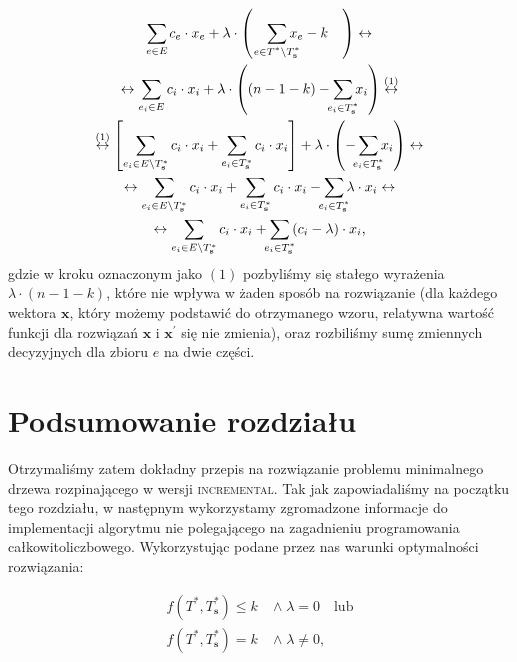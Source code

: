 \begin{gather}\label{eq:imstcosts}
	\sum_{\mathclap{e \in E}} c_{e} \cdot x_{e} + \lambda \cdot \left( \quad \sum_{\mathclap{e \in T^{\ast} \setminus T^{\ast}_{\textbf{s}}}} x_{e} - k \quad \right) \leftrightarrow \\
	\leftrightarrow \sum_{e_{i} \in E} c_{i} \cdot x_{i} + \lambda \cdot \left( \left( n - 1 - k \right) - \sum_{\mathclap{e_{i} \in T^{\ast}_{\textbf{s}}}} x_{i} \right) \overset{\left( 1 \right)}{\leftrightarrow}\\
	\overset{\left( 1 \right)}{\leftrightarrow} \left[ \sum_{e_{i} \in E \setminus T^{\ast}_{\textbf{s}}} c_{i} \cdot x_{i} + \sum_{e_{i} \in T^{\ast}_{\textbf{s}}} c_{i} \cdot x_{i} \right] + \lambda \cdot \left( - \sum_{\mathclap{e_{i} \in T^{\ast}_{\textbf{s}}}} x_{i} \right) \leftrightarrow \\
	\leftrightarrow \sum_{e_{i} \in E \setminus T^{\ast}_{\textbf{s}}} c_{i} \cdot x_{i} + \sum_{e_{i} \in T^{\ast}_{\textbf{s}}} c_{i} \cdot x_{i} - \sum_{\mathclap{e_{i} \in T^{\ast}_{\textbf{s}}}} \lambda \cdot x_{i} \leftrightarrow \\
	\leftrightarrow \sum_{e_{i} \in E \setminus T^{\ast}_{\textbf{s}}} c_{i} \cdot x_{i} + \sum_{\mathclap{e_{i} \in T^{\ast}_{\textbf{s}}}} \left( c_{i} - \lambda \right) \cdot x_{i}\label{eq:imstcosts:e}\text{,}
\end{gather}
gdzie w kroku oznaczonym jako $\left( 1 \right)$ pozbyliśmy się stałego wyrażenia $\lambda \cdot \left( n - 1 - k \right)$, które nie wpływa w żaden sposób na rozwiązanie (dla każdego wektora $\textbf{x}$, który możemy podstawić do otrzymanego wzoru, relatywna wartość funkcji dla rozwiązań $\textbf{x}$ i $\textbf{x}^{\prime}$ się nie zmienia), oraz rozbiliśmy sumę zmiennych decyzyjnych dla zbioru $e$ na dwie części.

\section{Podsumowanie rozdziału}

Otrzymaliśmy zatem dokładny przepis na rozwiązanie problemu minimalnego drzewa rozpinającego w wersji \textsc{incremental}. Tak jak zapowiadaliśmy na początku tego rozdziału, w następnym wykorzystamy zgromadzone informacje do implementacji algorytmu nie polegającego na zagadnieniu programowania całkowitoliczbowego. Wykorzystując podane przez nas warunki optymalności rozwiązania:

\begin{align}
	f \left( T^{\ast}, T^{\ast}_{\textbf{s}} \right) \leqslant k \; & \wedge \; \lambda = 0 \quad \text{lub}\label{eq:imstoptcond1}\\
	f \left( T^{\ast}, T^{\ast}_{\textbf{s}} \right) = k \; & \wedge \; \lambda \neq 0\text{,}\label{eq:imstoptcond2}
\end{align}\label{eq:imstcompl}

